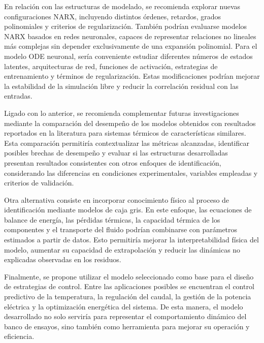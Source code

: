 \documentclass[11pt]{report}
\begin{document}
En relación con las estructuras de modelado, se recomienda explorar nuevas configuraciones NARX, incluyendo distintos órdenes, retardos, grados polinomiales y criterios de regularización. También podrían evaluarse modelos NARX basados en redes neuronales, capaces de representar relaciones no lineales más complejas sin depender exclusivamente de una expansión polinomial. Para el modelo ODE neuronal, sería conveniente estudiar diferentes números de estados latentes, arquitecturas de red, funciones de activación, estrategias de entrenamiento y términos de regularización. Estas modificaciones podrían mejorar la estabilidad de la simulación libre y reducir la correlación residual con las entradas.

Ligado con lo anterior, se recomienda complementar futuras investigaciones mediante la comparación del desempeño de los modelos obtenidos con resultados reportados en la literatura para sistemas térmicos de características similares. Esta comparación permitiría contextualizar las métricas alcanzadas, identificar posibles brechas de desempeño y evaluar si las estructuras desarrolladas presentan resultados consistentes con otros enfoques de identificación, considerando las diferencias en condiciones experimentales, variables empleadas y criterios de validación.

Otra alternativa consiste en incorporar conocimiento físico al proceso de identificación mediante modelos de caja gris. En este enfoque, las ecuaciones de balance de energía, las pérdidas térmicas, la capacidad térmica de los componentes y el transporte del fluido podrían combinarse con parámetros estimados a partir de datos. Esto permitiría mejorar la interpretabilidad física del modelo, aumentar su capacidad de extrapolación y reducir las dinámicas no explicadas observadas en los residuos.

Finalmente, se propone utilizar el modelo seleccionado como base para el diseño de estrategias de control. Entre las aplicaciones posibles se encuentran el control predictivo de la temperatura, la regulación del caudal, la gestión de la potencia eléctrica y la optimización energética del sistema. De esta manera, el modelo desarrollado no solo serviría para representar el comportamiento dinámico del banco de ensayos, sino también como herramienta para mejorar su operación y eficiencia.
\end{document}
